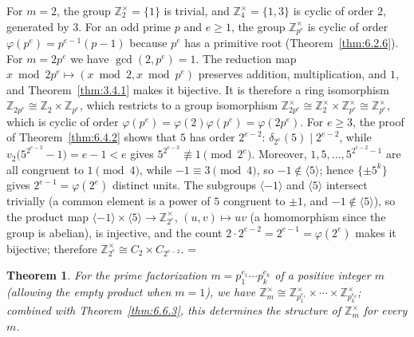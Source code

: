 \documentclass[11pt]{article}
\makeatletter
\theoremstyle{ntstyle}
\newtheorem{theorem}{Theorem}[subsection]
\let\nt@closedisplay\]
\def\nt@guardedclose{\@ifnextchar\par{\nt@closeafterpar}{\@ifnextchar\end{\postdisplaypenalty\@M\nt@closedisplay}{\nt@closedisplay}}}
\def\nt@closeafterpar\par{\@ifnextchar\par{\nt@closeafterpar}{\@ifnextchar\end{\postdisplaypenalty\@M\nt@closedisplay\par}{\nt@closedisplay\par}}}
\renewenvironment{proof}[1][\proofname]{\par
  \pushQED{\qed}\normalfont\topsep\medskipamount\edef\nt@afterproof{\@endparpenalty=\the\@endparpenalty\relax}\@beginparpenalty\@M\@endparpenalty\@M\let\]\nt@guardedclose\trivlist\item[]\textit{#1\@addpunct{.}} \ignorespaces}{\ifvmode\addpenalty\@M\fi\popQED\nt@afterproof\endtrivlist\@endpefalse}
\newcommand{\ZmodUnits}[1]{\mathbb{Z}_{#1}^{\times}}
\makeatother
\begin{document}
\begin{proof} For $m = 2$, the group $\ZmodUnits{2}
		= \{1\}$ is trivial, and $\ZmodUnits{4} = \{1, 3\}$ is cyclic of
	order $2$, generated by $3$. For an odd prime $p$ and $e \ge 1$, the
	group $\ZmodUnits{p^{e}}$ is cyclic of order $\varphi(p^{e}) =
		p^{e-1}(p-1)$ because $p^{e}$ has a primitive root (Theorem~\ref{thm:6.2.6}). For
	$m = 2p^{e}$ we have $\gcd(2, p^{e}) = 1$. The reduction map
	$x\bmod2p^e\mapsto(x\bmod2,x\bmod p^e)$ preserves addition,
	multiplication, and $1$, and Theorem~\ref{thm:3.4.1} makes it
	bijective. It is therefore a ring isomorphism
	$\mathbb{Z}_{2p^{e}} \cong \mathbb{Z}_2\times\mathbb{Z}_{p^{e}}$,
	which restricts to a group isomorphism
	$\ZmodUnits{2p^{e}} \cong \ZmodUnits{2} \times
		\ZmodUnits{p^{e}} \cong \ZmodUnits{p^{e}}$, which is
	cyclic of order $\varphi(p^{e}) = \varphi(2)\varphi(p^{e}) =
		\varphi(2p^{e})$. For $e \ge 3$, the proof of
	Theorem~\ref{thm:6.4.2} shows that $5$ has order $2^{e-2}$:
	$\delta_{2^e}(5) \mid 2^{e-2}$, while $v_2\big(5^{2^{e-3}} - 1\big) =
		e-1 < e$ gives $5^{2^{e-3}} \not\equiv 1 \pmod{2^e}$. Moreover, $1, 5,
		\ldots, 5^{2^{e-2}-1}$ are all congruent to $1 \pmod{4}$, while $-1 \equiv 3
		\pmod{4}$, so $-1 \notin \langle 5 \rangle$; hence $\{\pm 5^{k}\}$
	gives $2^{e-1} = \varphi(2^{e})$ distinct units. The subgroups
	$\langle-1\rangle$ and $\langle5\rangle$ intersect trivially (a common
	element is a power of $5$ congruent to $\pm1$, and
	$-1\notin\langle5\rangle$), so the product map
	$\langle-1\rangle\times\langle5\rangle\to\ZmodUnits{2^{e}}$,
	$(u,v)\mapsto uv$ (a homomorphism since the group is abelian), is
	injective, and the count $2\cdot2^{e-2}=2^{e-1}=\varphi(2^{e})$ makes
	it bijective; therefore
	$\ZmodUnits{2^{e}} \cong C_2 \times C_{2^{e-2}}$.
\end{proof}
\begin{theorem}\label{thm:6.6.4}
	For the prime factorization $m = p_1^{e_1} \cdots p_k^{e_k}$ of a positive integer $m$ (allowing
	the empty product when $m=1$), we have $\ZmodUnits{m} \cong
		\ZmodUnits{p_1^{e_1}} \times \cdots \times
		\ZmodUnits{p_k^{e_k}}$; combined with Theorem~\ref{thm:6.6.3}, this
	determines the structure of $\ZmodUnits{m}$ for every $m$.
\end{theorem}
\end{document}
